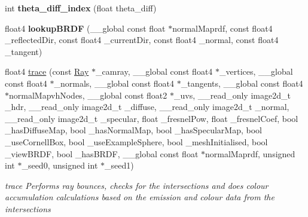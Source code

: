 \begin{DoxyCompactItemize}
\item 
\hypertarget{PathTracer_8cl_a13e99c424c0d5f3621b36dad4549c95b}{int {\bfseries theta\-\_\-diff\-\_\-index} (float theta\-\_\-diff)}\label{PathTracer_8cl_a13e99c424c0d5f3621b36dad4549c95b}

\item 
\hypertarget{PathTracer_8cl_a2fbc21ce9eec28e072932dba078d3523}{float4 {\bfseries lookup\-B\-R\-D\-F} (\-\_\-\-\_\-global const float $\ast$normal\-Maprdf, const float4 \-\_\-reflected\-Dir, const float4 \-\_\-current\-Dir, const float4 \-\_\-normal, const float4 \-\_\-tangent)}\label{PathTracer_8cl_a2fbc21ce9eec28e072932dba078d3523}

\item 
float4 \hyperlink{PathTracer_8cl_a0f5c7ab05243deb2bd02999b5ad1d716}{trace} (const \hyperlink{structRay}{Ray} $\ast$\-\_\-camray, \-\_\-\-\_\-global const float4 $\ast$\-\_\-vertices, \-\_\-\-\_\-global const float4 $\ast$\-\_\-normals, \-\_\-\-\_\-global const float4 $\ast$\-\_\-tangents, \-\_\-\-\_\-global const float4 $\ast$normal\-Mapvh\-Nodes, \-\_\-\-\_\-global const float2 $\ast$\-\_\-uvs, \-\_\-\-\_\-read\-\_\-only image2d\-\_\-t \-\_\-hdr, \-\_\-\-\_\-read\-\_\-only image2d\-\_\-t \-\_\-diffuse, \-\_\-\-\_\-read\-\_\-only image2d\-\_\-t \-\_\-normal, \-\_\-\-\_\-read\-\_\-only image2d\-\_\-t \-\_\-specular, float \-\_\-fresnel\-Pow, float \-\_\-fresnel\-Coef, bool \-\_\-has\-Diffuse\-Map, bool \-\_\-has\-Normal\-Map, bool \-\_\-has\-Specular\-Map, bool \-\_\-use\-Cornell\-Box, bool \-\_\-use\-Example\-Sphere, bool \-\_\-mesh\-Initialised, bool \-\_\-view\-B\-R\-D\-F, bool \-\_\-has\-B\-R\-D\-F, \-\_\-\-\_\-global const float $\ast$normal\-Maprdf, unsigned int $\ast$\-\_\-seed0, unsigned int $\ast$\-\_\-seed1)
\begin{DoxyCompactList}\small\item\em trace Performs ray bounces, checks for the intersections and does colour accumulation calculations based on the emission and colour data from the intersections \end{DoxyCompactList}\item 

\end{DoxyCompactItemize}
